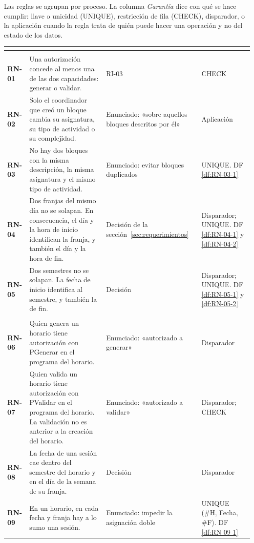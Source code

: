Las reglas se agrupan por proceso. La columna \emph{Garantía} dice con qué se hace cumplir: llave o unicidad (UNIQUE), restricción de fila (CHECK), disparador, o la aplicación cuando la regla trata de quién puede hacer una operación y no del estado de los datos.

{\footnotesize\filas
\begin{xltabular}{\linewidth}{>{\bfseries}p{11mm}L{1.35}L{0.75}L{0.6}}
 &  &  &  \\
\endhead
{} \\
RN-01 & Una autorización concede al menos una de las dos capacidades: generar o validar. & RI-03 & CHECK \\
RN-02 & Solo el coordinador que creó un bloque cambia su asignatura, su tipo de actividad o su complejidad. & Enunciado: «sobre aquellos bloques descritos por él» & Aplicación \\
RN-03 & No hay dos bloques con la misma descripción, la misma asignatura y el mismo tipo de actividad. & Enunciado: evitar bloques duplicados & UNIQUE. DF \ref{df:RN-03-1} \\
RN-04 & Dos franjas del mismo día no se solapan. En consecuencia, el día y la hora de inicio identifican la franja, y también el día y la hora de fin. & Decisión de la sección~\ref{sec:requerimientos} & Disparador; UNIQUE. DF \ref{df:RN-04-1} y \ref{df:RN-04-2} \\
RN-05 & Dos semestres no se solapan. La fecha de inicio identifica al semestre, y también la de fin. & Decisión & Disparador; UNIQUE. DF \ref{df:RN-05-1} y \ref{df:RN-05-2} \\
 \\
RN-06 & Quien genera un horario tiene autorización con PGenerar en el programa del horario. & Enunciado: «autorizado a generar» & Disparador \\
RN-07 & Quien valida un horario tiene autorización con PValidar en el programa del horario. La validación no es anterior a la creación del horario. & Enunciado: «autorizado a validar» & Disparador; CHECK \\
RN-08 & La fecha de una sesión cae dentro del semestre del horario y en el día de la semana de su franja. & Decisión & Disparador \\
RN-09 & En un horario, en cada fecha y franja hay a lo sumo una sesión. & Enunciado: impedir la asignación doble & UNIQUE (\#H, Fecha, \#F). DF \ref{df:RN-09-1} \\

\end{xltabular}}

